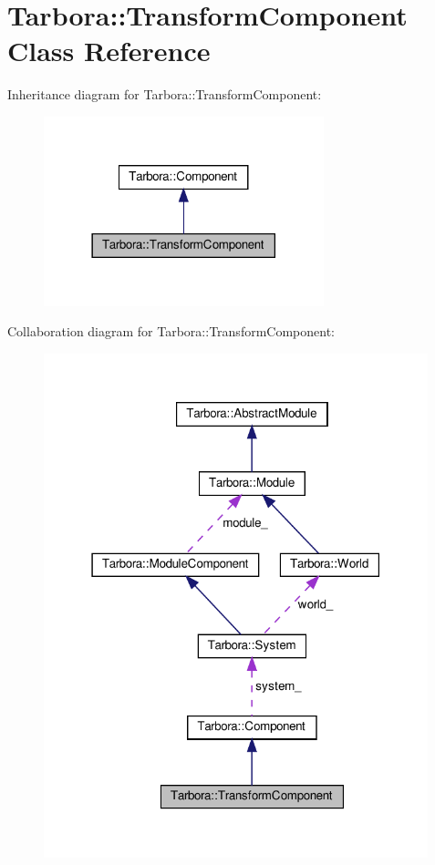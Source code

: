 \hypertarget{classTarbora_1_1TransformComponent}{}\section{Tarbora\+:\+:Transform\+Component Class Reference}
\label{classTarbora_1_1TransformComponent}


Inheritance diagram for Tarbora\+:\+:Transform\+Component\+:
\nopagebreak
\begin{figure}[H]
\begin{center}
\leavevmode
\includegraphics[width=230pt]{classTarbora_1_1TransformComponent__inherit__graph}
\end{center}
\end{figure}


Collaboration diagram for Tarbora\+:\+:Transform\+Component\+:
\nopagebreak
\begin{figure}[H]
\begin{center}
\leavevmode
\includegraphics[width=316pt]{classTarbora_1_1TransformComponent__coll__graph}
\end{center}
\end{figure}
